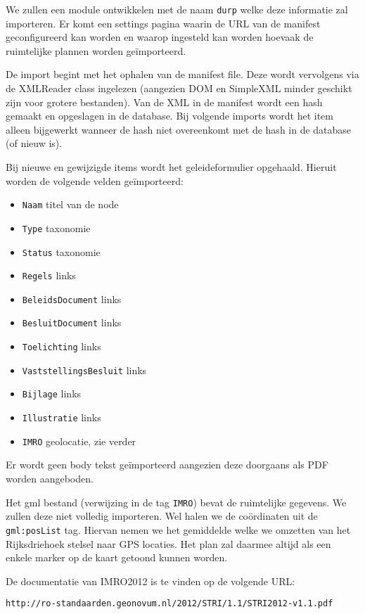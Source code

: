 We zullen een module ontwikkelen met de naam \texttt{durp} welke deze informatie zal importeren. Er komt een settings pagina waarin de URL van de manifest geconfigureerd kan worden en waarop ingesteld kan worden hoevaak de ruimtelijke plannen worden ge\"{i}mporteerd.

De import begint met het ophalen van de manifest file. Deze wordt vervolgens via de XMLReader class ingelezen (aangezien DOM en SimpleXML minder geschikt zijn voor grotere bestanden). Van de XML in de manifest wordt een hash gemaakt en opgeslagen in de database. Bij volgende imports wordt het item alleen bijgewerkt wanneer de hash niet overeenkomt met de hash in de database (of nieuw is).

Bij nieuwe en gewijzigde items wordt het geleideformulier opgehaald. Hieruit worden de volgende velden ge\"{i}mporteerd:
\begin{itemize}
\item \texttt{Naam} titel van de node
\item \texttt{Type} taxonomie
\item \texttt{Status} taxonomie
\item \texttt{Regels} links
\item \texttt{BeleidsDocument} links
\item \texttt{BesluitDocument} links
\item \texttt{Toelichting} links
\item \texttt{VaststellingsBesluit} links
\item \texttt{Bijlage} links
\item \texttt{Illustratie} links
\item \texttt{IMRO} geolocatie, zie verder
\end{itemize}
Er wordt geen body tekst ge\"{i}mporteerd aangezien deze doorgaans als PDF worden aangeboden.

Het gml bestand (verwijzing in de tag \texttt{IMRO}) bevat de ruimtelijke gegevens. We zullen deze niet volledig importeren. Wel halen we de co\"{o}rdinaten uit de \texttt{gml:posList} tag. Hiervan nemen we het gemiddelde welke we omzetten van het Rijksdriehoek stelsel naar GPS locaties. Het plan zal daarmee altijd als een enkele marker op de kaart getoond kunnen worden.

De documentatie van IMRO2012 is te vinden op de volgende URL:
\begin{verbatim}
http://ro-standaarden.geonovum.nl/2012/STRI/1.1/STRI2012-v1.1.pdf
\end{verbatim}





